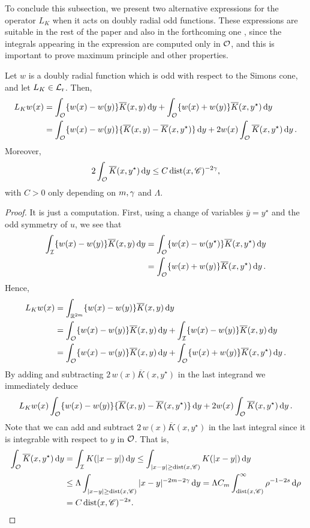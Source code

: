 To conclude this subsection, we present two alternative expressions for the operator $L_K$ when it acts on doubly radial odd functions. These expressions are suitable in the rest of the paper and also in the forthcoming one \cite{FelipeSanz-Perela:IntegroDifferentialII}, since the integrals appearing in the expression are computed only in $\mathcal{O}$, and this is important to prove maximum principle and other properties.

\begin{lemma}
	\label{Lemma:OperatorOddF}
	Let $w$ is a doubly radial function which is odd with respect to the Simons cone, and let $L_K \in \mathcal{L}_{\mathrm{r}}$. Then,
	\begin{align*}
	L_K w (x) &= \int_{\mathcal{O}} \{w(x) - w(y) \} \overline{K}(x, y) \,\mathrm{d} y +  \int_{\mathcal{O}} \{w(x) + w(y) \} \overline{K}(x, y^\star) \,\mathrm{d} y \\
	&= \int_{\mathcal{O}} \{w(x) - w(y) \} \{\overline{K}(x, y) - \overline{K}(x, y^\star)  \} \,\mathrm{d} y +  2 w(x) \int_{\mathcal{O}} \overline{K}(x, y^\star) \,\mathrm{d} y \,.
	\end{align*}
	Moreover, 
	$$ 2 \int_{\mathcal{O}} \overline{K}(x, y^\star) \,\mathrm{d} y \leq C \operatorname{dist}(x,\mathscr{C})^{-2\gamma}, $$
	with $C>0$ only depending on $m, \gamma$ and $\Lambda$.
\end{lemma}

\begin{proof}
	It is just a computation. First,  using a change of variables  $\bar{y} = y^\star$ and the odd symmetry of $u$, we see that
	\begin{align*}
	\int_{\mathcal{I}}  \{w(x) - w(y) \} \overline{K}(x, y)\,\mathrm{d} y &= \int_{\mathcal{O}} \{w(x) - w(y^\star) \}\overline{K}(x, y^\star)\,\mathrm{d} y \\
	&= \int_{\mathcal{O}} \{w(x) + w(y) \}\overline{K}(x, y^\star)\,\mathrm{d} y\,.
	\end{align*}
	Hence,
	\begin{align*}
	L_K w (x) &= \int_{\mathbb{R}^{2m}}  \{w(x) - w(y) \} \overline{K}(x, y)\,\mathrm{d} y \\
	&= \int_{\mathcal{O}}  \{w(x) - w(y) \} \overline{K}(x, y)\,\mathrm{d} y +\int_{\mathcal{I}}  \{w(x) - w(y) \} \overline{K}(x, y)\,\mathrm{d} y \\
	&= \int_{\mathcal{O}} \{w(x) - w(y) \} \overline{K}(x, y) \,\mathrm{d} y +  \int_{\mathcal{O}} \{w(x) + w(y) \} \overline{K}(x, y^\star) \,\mathrm{d} y \,.
	\end{align*}
	By adding and subtracting $2\,w(x)\overline{K}(x, y^\star)$ in the last integrand we immediately deduce
	$$
	L_K w (x) \int_{\mathcal{O}} \{w(x) - w(y) \} \{\overline{K}(x, y) - \overline{K}(x, y^\star)  \} \,\mathrm{d} y +  2 w(x) \int_{\mathcal{O}} \overline{K}(x, y^\star) \,\mathrm{d} y\,.
	$$
	Note that we can add and subtract $2\,w(x)\overline{K}(x, y^\star)$ in the last integral since it is integrable with respect to $y$ in $\mathcal{O}$. That is,
	\begin{align*}
\int_{\mathcal{O}} \overline{K}(x, y^\star) \,\mathrm{d} y &=  \int_{\mathcal{I}} K(|x-y|) \,\mathrm{d} y \leq \int_{|x-y|\geq \operatorname{dist}(x,\mathscr{C})} K(|x-y|) \,\mathrm{d} y \\
&\leq \Lambda \int_{|x-y|\geq \operatorname{dist}(x,\mathscr{C})} |x-y|^{-2m-2\gamma} \,\mathrm{d} y = \Lambda C_m \int_{\operatorname{dist}(x,\mathscr{C})}^\infty \rho^{-1-2s} \,\mathrm{d} \rho \\
&= C \operatorname{dist}(x,\mathscr{C})^{-2s}.
	\end{align*}
\end{proof}

